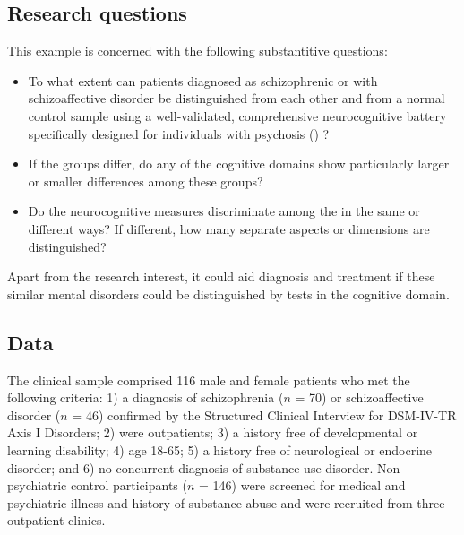 \documentclass[
  letterpaper,
  10pt,
  krantz2]{krantz}
\begin{document}
{\subsection{Research questions}\label{research-questions}

This example is concerned with the following substantitive questions:

\begin{itemize}
\item
  To what extent can patients diagnosed as schizophrenic or with
  schizoaffective disorder be distinguished from each other and from a
  normal control sample using a well-validated, comprehensive
  neurocognitive battery specifically designed for individuals with
  psychosis ()
  ?
\item
  If the groups differ, do any of the cognitive domains show
  particularly larger or smaller differences among these groups?
\item
  Do the neurocognitive measures discriminate among the in the same or
  different ways? If different, how many separate aspects or dimensions
  are distinguished?
\end{itemize}

Apart from the research interest, it could aid diagnosis and treatment
if these similar mental disorders could be distinguished by tests in the
cognitive domain.

\subsection{Data}\label{data}

The clinical sample comprised 116 male and female patients who met the
following criteria: 1) a diagnosis of schizophrenia (\(n\) = 70) or
schizoaffective disorder (\(n\) = 46) confirmed by the Structured
Clinical Interview for DSM-IV-TR Axis I Disorders; 2) were outpatients;
3) a history free of developmental or learning disability; 4) age 18-65;
5) a history free of neurological or endocrine disorder; and 6) no
concurrent diagnosis of substance use disorder. Non-psychiatric control
participants (\(n\) = 146) were screened for medical and psychiatric
illness and history of substance abuse and were recruited from three
outpatient clinics.

}
\end{document}
